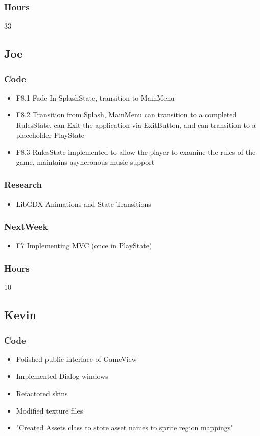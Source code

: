 \documentclass[10pt,a4paper]{article}
\begin{document}
\subsubsection*{Hours}
33

\newpage
\subsection*{Joe}

\subsubsection*{Code}
\begin{itemize}
\item F8.1 Fade-In SplashState, transition to MainMenu
\item F8.2 Transition from Splash, MainMenu can transition to a completed RulesState, can Exit the application via ExitButton, and can transition to a placeholder PlayState
\item F8.3 RulesState implemented to allow the player to examine the rules of the game, maintains asyncronous music support
\end{itemize}
\subsubsection*{Research}
\begin{itemize}
\item LibGDX Animations and State-Transitions
\end{itemize}
\subsubsection*{NextWeek}
\begin{itemize}
\item F7 Implementing MVC (once in PlayState)
\end{itemize}
\subsubsection*{Hours}
10

\newpage
\subsection*{Kevin}

\subsubsection*{Code}
\begin{itemize}
\item Polished public interface of GameView
\item Implemented Dialog windows
\item Refactored skins
\item Modified texture files
\item "Created Assets class to store asset names to sprite region mappings"
\end{itemize}
\end{document}
